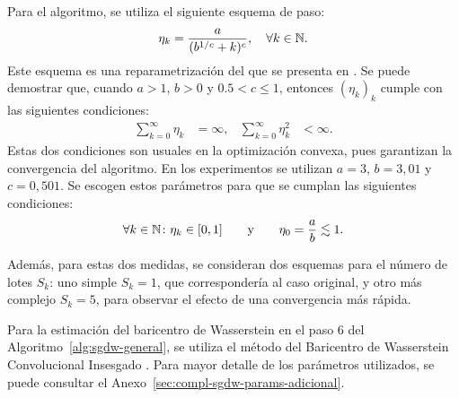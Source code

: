 Para el algoritmo, se utiliza el siguiente esquema de paso:
\begin{equation}\label{eq:esquema-paso}
    \eta_k = \frac{a}{(b^{1/c} + k)^c},\quad \forall k \in \mathbb{N}.
\end{equation}
Este esquema es una reparametrización del que se presenta en \cite[Secc.~2]{welling2011bayesian}. Se puede demostrar que, cuando $a > 1$, $b > 0$ y $0.5 < c \leq 1$, entonces $(\eta_k)_{k}$ cumple con las siguientes condiciones:
\begin{align}
    \sum_{k=0}^{\infty} \eta_k   & = \infty, &
    \sum_{k=0}^{\infty} \eta_k^2 & < \infty.
\end{align}
Estas dos condiciones son usuales en la optimización convexa, pues garantizan la convergencia del algoritmo. En los experimentos se utilizan $a = 3$, $b = 3,01$ y $c = 0,501$. Se escogen estos parámetros para que se cumplan las siguientes condiciones:
\begin{equation}
    \forall k\in\mathbb{N} \colon \eta_k\in[0, 1]\qquad \text{y} \qquad \eta_0 = \frac{a}{b} \lesssim 1.
\end{equation}

Además, para estas dos medidas, se consideran dos esquemas para el número de lotes $S_k$: uno simple $S_k = 1$, que correspondería al caso original, y otro más complejo $S_k = 5$, para observar el efecto de una convergencia más rápida.

Para la estimación del baricentro de Wasserstein en el paso 6 del Algoritmo~\ref{alg:sgdw-general}, se utiliza el método del Baricentro de Wasserstein Convolucional Insesgado \cite{janati2020debiased}. Para mayor detalle de los parámetros utilizados, se puede consultar el Anexo~\ref{sec:compl-sgdw-params-adicional}.

